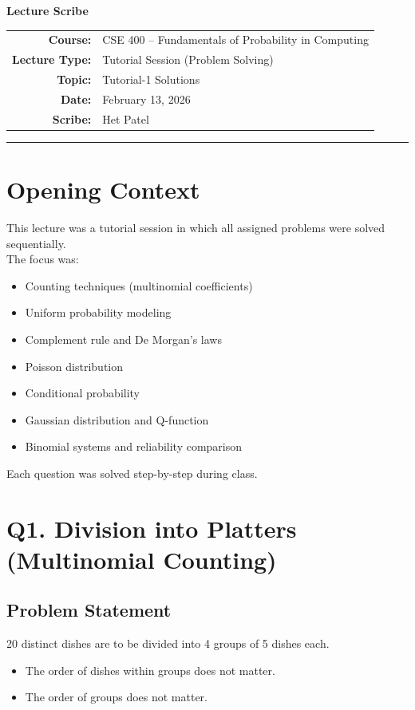 \documentclass[11pt]{article}
\begin{document}
\begin{center}
    {\Large \textbf{Lecture Scribe}} \\
    \vspace{0.3cm}
    \begin{tabular}{rl}
        \textbf{Course:} & CSE 400 – Fundamentals of Probability in Computing \\
        \textbf{Lecture Type:} & Tutorial Session (Problem Solving) \\
        \textbf{Topic:} & Tutorial-1 Solutions \\
        \textbf{Date:} & February 13, 2026 \\
        \textbf{Scribe:} & Het Patel
    \end{tabular}
\end{center}
\hrule
\vspace{0.5cm}


\section{Opening Context}
This lecture was a tutorial session in which all assigned problems were solved sequentially. \\
The focus was:
\begin{itemize}
    \item Counting techniques (multinomial coefficients)
    \item Uniform probability modeling
    \item Complement rule and De Morgan’s laws
    \item Poisson distribution
    \item Conditional probability
    \item Gaussian distribution and Q-function
    \item Binomial systems and reliability comparison
\end{itemize}
Each question was solved step-by-step during class.

\section{Q1. Division into Platters (Multinomial Counting)}

\subsection{Problem Statement}
20 distinct dishes are to be divided into 4 groups of 5 dishes each.
\begin{itemize}
    \item The order of dishes within groups does not matter.
    \item The order of groups does not matter.
\end{itemize}
\end{document}

